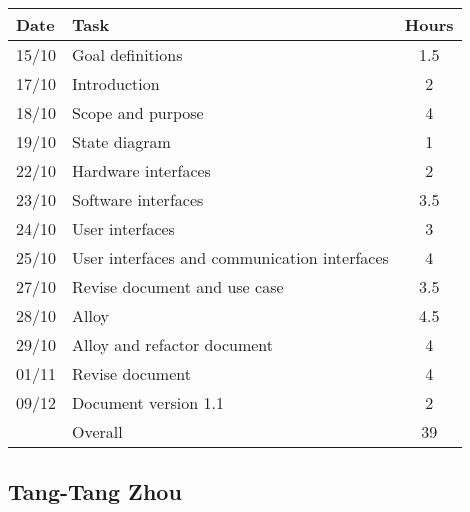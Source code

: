 \begin{table}[H]
\begin{tabularx}{\textwidth}{|l|X|c|}
\hline
\rowcolor[HTML]{C0C0C0} 
Date & Task & Hours\\ \hline
15/10 & Goal definitions & 1.5\\ \hline
17/10 & Introduction & 2\\ \hline
18/10 & Scope and purpose & 4\\ \hline
19/10 & State diagram & 1\\ \hline
22/10 & Hardware interfaces & 2\\ \hline 
23/10 & Software interfaces & 3.5\\ \hline
24/10 & User interfaces & 3\\ \hline
25/10 & User interfaces and communication interfaces & 4\\ \hline 
27/10 & Revise document and use case & 3.5\\ \hline
28/10 & Alloy & 4.5\\ \hline
29/10 & Alloy and refactor document & 4\\ \hline
01/11 & Revise document & 4 \\ \hline 
09/12 & Document version 1.1 & 2\\ \hline
\rowcolor[HTML]{C0C0C0} 
& Overall & 39\\ \hline
\end{tabularx}
\end{table}

\subsection{Tang-Tang Zhou}

